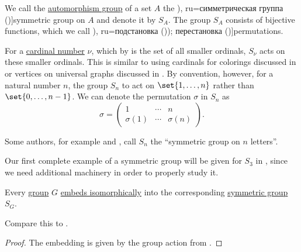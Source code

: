 \begin{definition}\label{def:symmetric_group}
  We call the \hyperref[def:automorphism_group]{automorphism group} of a set \( A \) the \term[bg=симетрична група (\cite[80]{ГеновМиховскиМоллов1991Алгебра}), ru=симметрическая группа (\cite[154]{Винберг2014Алгебра})]{symmetric group} on \( A \) and denote it by \( S_A \). The group \( S_A \) consists of bijective functions, which we call \term[bg=субституция (\cite[80]{ГеновМиховскиМоллов1991Алгебра}), ru=подстановка (\cite[154]{Винберг2014Алгебра})); перестановка (\cite[sec. 4.2]{Тыртышников2007ЛинАлгебра})]{permutations}.

  For a \hyperref[def:cardinal]{cardinal number} \( \nu \), which by  is the set of all smaller ordinals, \( S_\nu \) acts on these smaller ordinals. This is similar to using cardinals for colorings discussed in  or vertices on universal graphs discussed in . By convention, however, for a natural number \( n \), the group \( S_n \) to act on \( \set{ 1, \ldots, n } \) rather than \( \set{ 0, \ldots, n - 1 } \). We can denote the permutation \( \sigma \) in \( S_n \) as
  \begin{equation*}
    \sigma
    =
    \begin{pmatrix}
      1         & \cdots & n \\
      \sigma(1) & \cdots & \sigma(n)
    \end{pmatrix}.
  \end{equation*}
\end{definition}
\begin{comments}
  \item Some authors, for example  and , call \( S_n \) the \enquote{symmetric group on \( n \) letters}.

  \item Our first complete example of a symmetric group will be given for \( S_3 \) in , since we need additional machinery in order to properly study it.
\end{comments}

\begin{theorem}\label{thm:cayleys_theorem}
  Every \hyperref[def:group]{group} \( G \) \hyperref[rem:embeds_isomorphically]{embeds isomorphically} into the corresponding \hyperref[def:symmetric_group]{symmetric group} \( S_G \).
\end{theorem}
\begin{comments}
  \item Compare this to .
\end{comments}
\begin{proof}
  The embedding is given by the group action from .
\end{proof}


